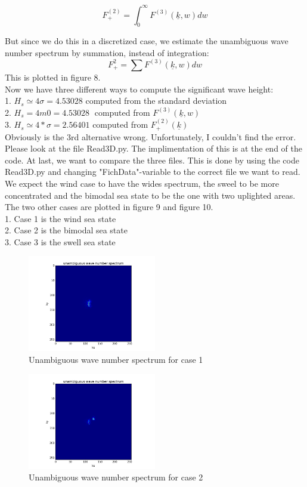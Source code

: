 \documentclass[12pt]{article}
\begin{document}
$$ F^{(2)}_+ = \int^{\infty}_0 F^{(3)}(\underline{k},w)dw $$

But since we do this in a discretized case, we estimate the unambiguous wave number spectrum by summation, instead of integration:
$$ F^{2}_+ = \sum F^{(3)}(\underline{k},w)dw$$
This is plotted in figure 8. \\Now we have three different ways to compute the significant wave height:\\
1. $H_s \simeq 4 \sigma = 4.53028$ computed from the standard deviation\\
2. $H_s = 4  m0 = 4.53028 \; $ computed from $F^{(3)}(\underline{k},w)$\\
3. $H_s \simeq 4 * \sigma = 2.56401$ computed from $F^{(2)}_{+}(\underline{k})$\\

Obviously is the 3rd alternative wrong. Unfortunately, I couldn't find the error. Please look at the file Read3D.py. The implimentation of this is at the end of the code. At last, we want to compare the three files. This is done by using the code Read3D.py and changing "FichData"-variable to the correct file we want to read. We expect the wind case to have the wides spectrum, the sweel to be more concentrated and the bimodal sea state to be the one with two uplighted areas.
The two other cases are plotted in figure 9 and figure 10.\\
1. Case 1 is the wind sea state\\
2. Case 2 is the bimodal sea state\\
3. Case 3 is the swell sea state\\



\begin{figure}
  \caption{Unambiguous wave number spectrum for case 1}
  \centering
    \includegraphics[width=0.5\textwidth]{unam_w_n_s.png}
\end{figure}

\begin{figure}
  \caption{Unambiguous wave number spectrum for case 2}
  \centering
    \includegraphics[width=0.5\textwidth]{unam_w_n_s_2.png}
\end{figure}
\end{document}
